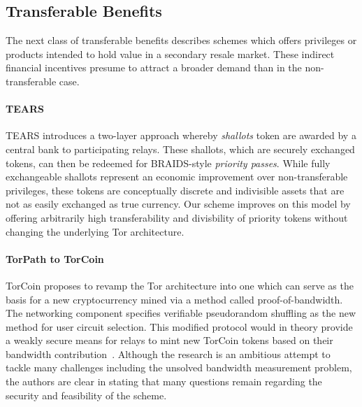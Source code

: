 \subsection{Transferable Benefits}

The next class of transferable benefits describes schemes which offers
privileges or products intended to hold value in a secondary resale market. These
indirect financial incentives presume to attract a broader demand than in the
non-transferable case.

\paragraph*{TEARS} TEARS introduces a two-layer approach whereby \emph{shallots}
token are awarded by a central bank to participating relays. These shallots,
which are securely exchanged tokens, can then be redeemed for BRAIDS-style
\emph{priority passes}. While fully exchangeable shallots represent an economic
improvement over non-transferable privileges, these tokens are conceptually
discrete and indivisible assets that are not as easily exchanged as true
currency. Our scheme improves on this model by offering arbitrarily high
transferability and divisbility of priority tokens without changing the
underlying Tor architecture.

\paragraph*{TorPath to TorCoin} TorCoin proposes to revamp the Tor
architecture into one which can serve as the basis for a new cryptocurrency
mined via a method called proof-of-bandwidth. The networking component specifies
verifiable pseudorandom shuffling as the new method for user circuit
selection. This modified protocol would in theory provide a weakly secure means
for relays to mint new TorCoin tokens based on their bandwidth
contribution~\cite{ghosh2014torpath}. Although the research is an ambitious
attempt to tackle many challenges including the unsolved bandwidth measurement
problem, the authors are clear in stating that many questions remain regarding
the security and feasibility of the scheme.

